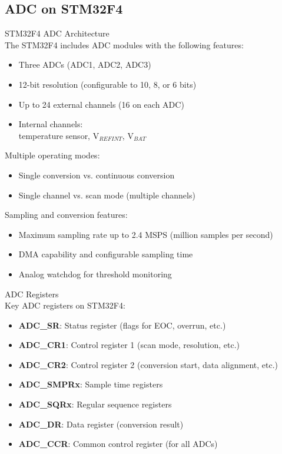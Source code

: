 \subsection{ADC on STM32F4}


\begin{concept}{STM32F4 ADC Architecture}\\
The STM32F4 includes ADC modules with the following features:
\begin{itemize}
    \item Three ADCs (ADC1, ADC2, ADC3)
    \item 12-bit resolution (configurable to 10, 8, or 6 bits)
    \item Up to 24 external channels (16 on each ADC)
    \item Internal channels: \\ temperature sensor, V$_{REFINT}$, V$_{BAT}$
\end{itemize}
 Multiple operating modes:
    \begin{itemize}
        \item Single conversion vs. continuous conversion
        \item Single channel vs. scan mode (multiple channels)
    \end{itemize}
Sampling and conversion features:
\begin{itemize}
    \item Maximum sampling rate up to 2.4 MSPS (million samples per second)
    \item DMA capability and configurable sampling time
    \item Analog watchdog for threshold monitoring
\end{itemize}
\end{concept}



\begin{definition}{ADC Registers}\\
Key ADC registers on STM32F4:
\begin{itemize}
    \item \textbf{ADC\_SR}: Status register (flags for EOC, overrun, etc.)
    \item \textbf{ADC\_CR1}: Control register 1 (scan mode, resolution, etc.)
    \item \textbf{ADC\_CR2}: Control register 2 (conversion start, data alignment, etc.)
    \item \textbf{ADC\_SMPRx}: Sample time registers
    \item \textbf{ADC\_SQRx}: Regular sequence registers
    \item \textbf{ADC\_DR}: Data register (conversion result)
    \item \textbf{ADC\_CCR}: Common control register (for all ADCs)
\end{itemize}
\end{definition}


